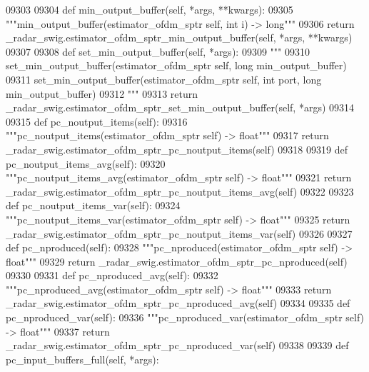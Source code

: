 \begin{DoxyCode}
{{{{{{{{{{{{{{{{{{{{{{{{{{{{{{09303 
09304     \textcolor{keyword}{def }min_output_buffer(self, *args, **kwargs):
09305         \textcolor{stringliteral}{"""min\_output\_buffer(estimator\_ofdm\_sptr self, int i) -> long"""}
09306         \textcolor{keywordflow}{return} \_radar\_swig.estimator\_ofdm\_sptr\_min\_output\_buffer(self, *args, **kwargs)
09307 
09308     \textcolor{keyword}{def }set_min_output_buffer(self, *args):
09309         \textcolor{stringliteral}{"""}
09310 \textcolor{stringliteral}{        set\_min\_output\_buffer(estimator\_ofdm\_sptr self, long min\_output\_buffer)}
09311 \textcolor{stringliteral}{        set\_min\_output\_buffer(estimator\_ofdm\_sptr self, int port, long min\_output\_buffer)}
09312 \textcolor{stringliteral}{        """}
09313         \textcolor{keywordflow}{return} \_radar\_swig.estimator\_ofdm\_sptr\_set\_min\_output\_buffer(self, *args)
09314 
09315     \textcolor{keyword}{def }pc_noutput_items(self):
09316         \textcolor{stringliteral}{"""pc\_noutput\_items(estimator\_ofdm\_sptr self) -> float"""}
09317         \textcolor{keywordflow}{return} \_radar\_swig.estimator\_ofdm\_sptr\_pc\_noutput\_items(self)
09318 
09319     \textcolor{keyword}{def }pc_noutput_items_avg(self):
09320         \textcolor{stringliteral}{"""pc\_noutput\_items\_avg(estimator\_ofdm\_sptr self) -> float"""}
09321         \textcolor{keywordflow}{return} \_radar\_swig.estimator\_ofdm\_sptr\_pc\_noutput\_items\_avg(self)
09322 
09323     \textcolor{keyword}{def }pc_noutput_items_var(self):
09324         \textcolor{stringliteral}{"""pc\_noutput\_items\_var(estimator\_ofdm\_sptr self) -> float"""}
09325         \textcolor{keywordflow}{return} \_radar\_swig.estimator\_ofdm\_sptr\_pc\_noutput\_items\_var(self)
09326 
09327     \textcolor{keyword}{def }pc_nproduced(self):
09328         \textcolor{stringliteral}{"""pc\_nproduced(estimator\_ofdm\_sptr self) -> float"""}
09329         \textcolor{keywordflow}{return} \_radar\_swig.estimator\_ofdm\_sptr\_pc\_nproduced(self)
09330 
09331     \textcolor{keyword}{def }pc_nproduced_avg(self):
09332         \textcolor{stringliteral}{"""pc\_nproduced\_avg(estimator\_ofdm\_sptr self) -> float"""}
09333         \textcolor{keywordflow}{return} \_radar\_swig.estimator\_ofdm\_sptr\_pc\_nproduced\_avg(self)
09334 
09335     \textcolor{keyword}{def }pc_nproduced_var(self):
09336         \textcolor{stringliteral}{"""pc\_nproduced\_var(estimator\_ofdm\_sptr self) -> float"""}
09337         \textcolor{keywordflow}{return} \_radar\_swig.estimator\_ofdm\_sptr\_pc\_nproduced\_var(self)
09338 
09339     \textcolor{keyword}{def }pc_input_buffers_full(self, *args):
}}}}}}}}}}}}}}}}}}}}}}}}}}}}}}
\end{DoxyCode}
